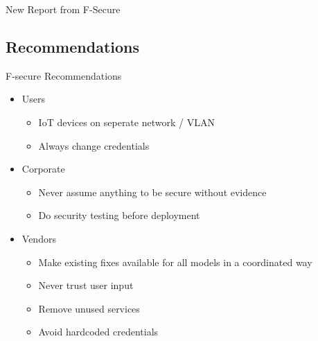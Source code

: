 \begin{frame}{New Report from F-Secure}
\end{frame}

\subsection{Recommendations}
\begin{frame}{F-secure Recommendations}

\begin{itemize}
	\item Users
\begin{itemize}
	\item IoT devices on seperate network / VLAN
	\item Always change credentials
\end{itemize}
	\item Corporate
\begin{itemize}
	\item Never assume anything to be secure without evidence
	\item Do security testing before deployment
\end{itemize}
	\item Vendors
\begin{itemize}
	\item Make existing fixes available for all models in a coordinated way
	\item Never trust user input
	\item Remove unused services
	\item Avoid hardcoded credentials
\end{itemize}
\end{itemize}
	
\end{frame}
